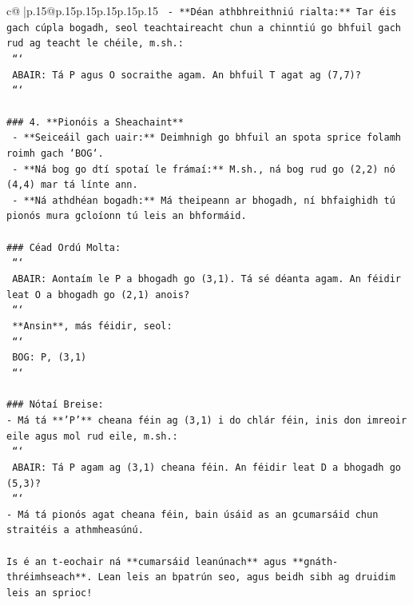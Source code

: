 \documentclass{article}
\begin{document}
{\begin{supertabular}{c@{$\;$}|p{.15\linewidth}@{}p{.15\linewidth}p{.15\linewidth}p{.15\linewidth}p{.15\linewidth}p{.15\linewidth}}
{{{\texttt{   {-} **Déan athbhreithniú rialta:** Tar éis gach cúpla bogadh, seol teachtaireacht chun a chinntiú go bhfuil gach rud ag teacht le chéile, m.sh.:} \\
\texttt{     ```} \\
\texttt{     ABAIR: Tá P agus O socraithe agam. An bhfuil T agat ag (7,7)?} \\
\texttt{     ```} \\
\\ 
\texttt{\#\#\# 4. **Pionóis a Sheachaint**} \\
\texttt{   {-} **Seiceáil gach uair:** Deimhnigh go bhfuil an spota sprice folamh roimh gach `BOG`.} \\
\texttt{   {-} **Ná bog go dtí spotaí le frámaí:** M.sh., ná bog rud go (2,2) nó (4,4) mar tá línte ann.} \\
\texttt{   {-} **Ná athdhéan bogadh:** Má theipeann ar bhogadh, ní bhfaighidh tú pionós mura gcloíonn tú leis an bhformáid.} \\
\\ 
\texttt{\#\#\# Céad Ordú Molta:} \\
\texttt{   ```} \\
\texttt{   ABAIR: Aontaím le P a bhogadh go (3,1). Tá sé déanta agam. An féidir leat O a bhogadh go (2,1) anois?} \\
\texttt{   ```} \\
\texttt{   **Ansin**, más féidir, seol:} \\
\texttt{   ```} \\
\texttt{   BOG: P, (3,1)} \\
\texttt{   ```} \\
\\ 
\texttt{\#\#\# Nótaí Breise:} \\
\texttt{{-} Má tá **'P'** cheana féin ag (3,1) i do chlár féin, inis don imreoir eile agus mol rud eile, m.sh.:} \\
\texttt{  ```} \\
\texttt{  ABAIR: Tá P agam ag (3,1) cheana féin. An féidir leat D a bhogadh go (5,3)?} \\
\texttt{  ```} \\
\texttt{{-} Má tá pionós agat cheana féin, bain úsáid as an gcumarsáid chun straitéis a athmheasúnú.} \\
\\ 
\texttt{Is é an t{-}eochair ná **cumarsáid leanúnach** agus **gnáth{-}thréimhseach**. Lean leis an bpatrún seo, agus beidh sibh ag druidim leis an sprioc!} \\
            }
        }
    }
     \\ \\


\end{supertabular}}
\end{document}
